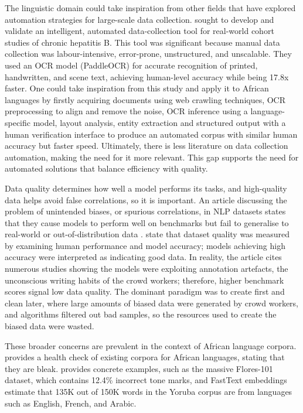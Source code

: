 \documentclass[11pt,a4paper]{article}
\begin{document}
The linguistic domain could take inspiration from other fields that have explored automation strategies for large-scale data collection. \citet{Zhou2024} sought to develop and validate an intelligent, automated data-collection tool for real-world cohort studies of chronic hepatitis B. This tool was significant because manual data collection was labour-intensive, error-prone, unstructured, and unscalable. They used an OCR model (PaddleOCR) for accurate recognition of printed, handwritten, and scene text, achieving human-level accuracy while being 17.8x faster. One could take inspiration from this study and apply it to African languages by firstly acquiring documents using web crawling techniques, OCR preprocessing to align and remove the noise, OCR inference using a language-specific model, layout analysis, entity extraction and structured output with a human verification interface to produce an automated corpus with similar human accuracy but faster speed. Ultimately, there is less literature on data collection automation, making the need for it more relevant. This gap supports the need for automated solutions that balance efficiency with quality. 

\vspace{2em}
Data quality determines how well a model performs its tasks, and high-quality data helps avoid false correlations, so it is important. An article discussing the problem of unintended biases, or spurious correlations, in NLP datasets states that they cause models to perform well on benchmarks but fail to generalise to real-world or out-of-distribution data \citep{Mishra2020}. \citet{Mishra2020} state that dataset quality was measured by examining human performance and model accuracy; models achieving high accuracy were interpreted as indicating good data. In reality, the article cites numerous studies showing the models were exploiting annotation artefacts, the unconscious writing habits of the crowd workers; therefore, higher benchmark scores signal low data quality. The dominant paradigm was to create first and clean later, where large amounts of biased data were generated by crowd workers, and algorithms filtered out bad samples, so the resources used to create the biased data were wasted. 


These broader concerns are prevalent in the context of African language corpora. \citet{Adebara2022} provides a health check of existing corpora for African languages, stating that they are bleak. \citet{Adebara2022} provides concrete examples, such as the massive Flores-101 dataset, which contains 12.4\% incorrect tone marks, and FastText embeddings estimate that 135K out of 150K words in the Yoruba corpus are from languages such as English, French, and Arabic.
\end{document}
